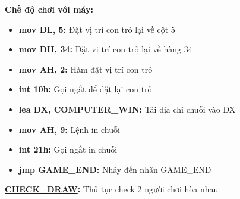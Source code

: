 \textbf{Chế độ chơi với máy:}

\begin{itemize}
    \item \textbf{mov DL, 5: }Đặt vị trí con trỏ lại về cột 5 
    \item \textbf{mov DH, 34:} Đặt vị trí con trỏ lại về hàng 34
    \item \textbf{mov AH, 2: }Hàm đặt vị trí con trỏ
    \item \textbf{int 10h:} Gọi ngắt để đặt lại con trỏ
    \item \textbf{lea DX, COMPUTER\_WIN:} Tải địa chỉ chuỗi vào DX
    \item \textbf{mov AH, 9:} Lệnh in chuỗi
    \item \textbf{int 21h:} Gọi ngắt in chuỗi
    \item \textbf{jmp GAME\_END:} Nhảy đến nhãn GAME\_END
\end{itemize}
\newpage
\textbf{\underline{CHECK\_DRAW}: }Thủ tục check 2 người chơi hòa nhau \\

